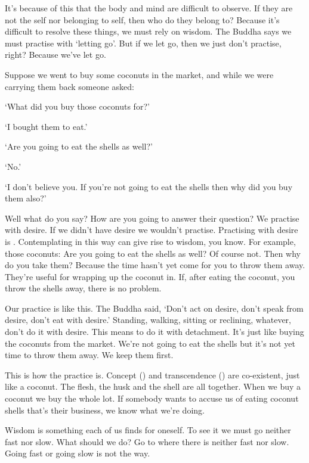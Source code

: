 It's because of this that the body and mind are difficult to observe. If they are not the self nor belonging to self, then who do they belong to? Because it's difficult to resolve these things, we must rely on wisdom. The Buddha says we must practise with `letting go'. But if we let go, then we just don't practise, right? Because we've let go.

Suppose we went to buy some coconuts in the market, and while we were carrying them back someone asked:

`What did you buy those coconuts for?'

`I bought them to eat.'

`Are you going to eat the shells as well?'

`No.'

`I don't believe you. If you're not going to eat the shells then why did you buy them also?'

Well what do you say? How are you going to answer their question? We practise with desire. If we didn't have desire we wouldn't practise. Practising with desire is . Contemplating in this way can give rise to wisdom, you know. For example, those coconuts: Are you going to eat the shells as well? Of course not. Then why do you take them? Because the time hasn't yet come for you to throw them away. They're useful for wrapping up the coconut in. If, after eating the coconut, you throw the shells away, there is no problem.

Our practice is like this. The Buddha said, `Don't act on desire, don't speak from desire, don't eat with desire.' Standing, walking, sitting or reclining, whatever, don't do it with desire. This means to do it with detachment. It's just like buying the coconuts from the market. We're not going to eat the shells but it's not yet time to throw them away. We keep them first.

This is how the practice is. Concept () and transcendence () are co-existent, just like a coconut. The flesh, the husk and the shell are all together. When we buy a coconut we buy the whole lot. If somebody wants to accuse us of eating coconut shells that's their business, we know what we're doing.

Wisdom is something each of us finds for oneself. To see it we must go neither fast nor slow. What should we do? Go to where there is neither fast nor slow. Going fast or going slow is not the way.

